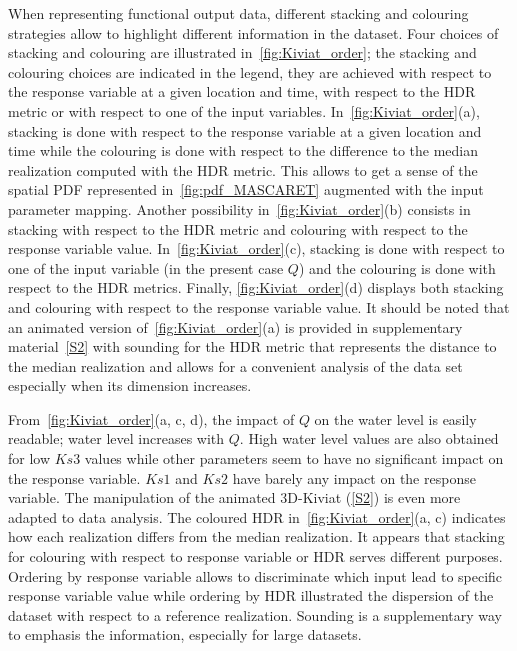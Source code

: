 When representing functional output data, different stacking and colouring strategies allow to highlight different information in the dataset. Four choices of stacking and colouring are illustrated in~\cref{fig:Kiviat_order}; the stacking and colouring choices are indicated in the legend, they are achieved with respect to the response variable at a given location and time, with respect to the HDR metric or with respect to one of the input variables. In~\cref{fig:Kiviat_order}(a), stacking is done with respect to the response variable at a given location and time while the colouring is done with respect to the difference to the median realization computed with the HDR metric. This allows to get a sense of the spatial PDF represented in~\cref{fig:pdf_MASCARET} augmented with the input parameter mapping. Another possibility in~\cref{fig:Kiviat_order}(b) consists in stacking with respect to the HDR metric and colouring with respect to the response variable value. In~\cref{fig:Kiviat_order}(c), stacking is done with respect to one of the input variable (in the present case $Q$) and the colouring is done with respect to the HDR metrics. Finally, \cref{fig:Kiviat_order}(d) displays both stacking and colouring with respect to the response variable value. It should be noted that an animated version of~\cref{fig:Kiviat_order}(a) is provided in supplementary material~\cref{S2} with sounding for the HDR metric that represents the distance to the median realization and allows for a convenient analysis of the data set especially when its dimension increases.

From~\cref{fig:Kiviat_order}(a, c, d), the impact of $Q$ on the water level is easily readable; water level increases with $Q$. High water level values are also obtained for low $Ks3$ values while other parameters seem to have no significant impact on the response variable. $Ks1$ and $Ks2$ have barely any impact on the response variable. The manipulation of the animated 3D-Kiviat (\cref{S2}) is even more adapted to data analysis. The coloured HDR in~\cref{fig:Kiviat_order}(a, c) indicates how each realization differs from the median realization. It appears that stacking for colouring with respect to response variable or HDR serves different purposes. Ordering by response variable allows to discriminate which input lead to specific response variable value while ordering by HDR illustrated the dispersion of the dataset with respect to a reference realization. Sounding is a supplementary way to emphasis the information, especially for large datasets.

